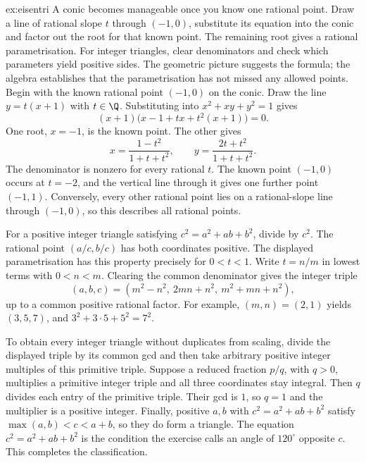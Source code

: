 \begin{solution}{ex:eisentri}
\idea A conic becomes manageable once you know one rational point. Draw a line of rational slope $t$ through $(-1,0)$, substitute its equation into the conic and factor out the root for that known point. The remaining root gives a rational parametrisation. For integer triangles, clear denominators and check which parameters yield positive sides. The geometric picture suggests the formula; the algebra establishes that the parametrisation has not missed any allowed points.
\writeup Begin with the known rational point $(-1,0)$ on the conic. Draw the line $y=t(x+1)$ with $t\in\Q$. Substituting into $x^2+xy+y^2=1$ gives
\[
(x+1)\bigl(x-1+tx+t^2(x+1)\bigr)=0.
\]
One root, $x=-1$, is the known point. The other gives
\[
x=\frac{1-t^2}{1+t+t^2},
\qquad
y=\frac{2t+t^2}{1+t+t^2}.
\]
The denominator is nonzero for every rational $t$. The known point $(-1,0)$ occurs at $t=-2$, and the vertical line through it gives one further point $(-1,1)$. Conversely, every other rational point lies on a rational-slope line through $(-1,0)$, so this describes all rational points.

For a positive integer triangle satisfying $c^2=a^2+ab+b^2$, divide by $c^2$. The rational point $(a/c,b/c)$ has both coordinates positive. The displayed parametrisation has this property precisely for $0<t<1$. Write $t=n/m$ in lowest terms with $0<n<m$. Clearing the common denominator gives the integer triple
\[
(a,b,c)=(m^2-n^2,\ 2mn+n^2,\ m^2+mn+n^2),
\]
up to a common positive rational factor. For example, $(m,n)=(2,1)$ yields $(3,5,7)$, and $3^2+3\cdot5+5^2=7^2$.

To obtain every integer triangle without duplicates from scaling, divide the displayed triple by its common gcd and then take arbitrary positive integer multiples of this primitive triple. Suppose a reduced fraction $p/q$, with $q>0$, multiplies a primitive integer triple and all three coordinates stay integral. Then $q$ divides each entry of the primitive triple. Their gcd is $1$, so $q=1$ and the multiplier is a positive integer. Finally, positive $a,b$ with $c^2=a^2+ab+b^2$ satisfy $\max(a,b)<c<a+b$, so they do form a triangle. The equation $c^2=a^2+ab+b^2$ is the condition the exercise calls an angle of $120^\circ$ opposite $c$. This completes the classification.
\end{solution}

